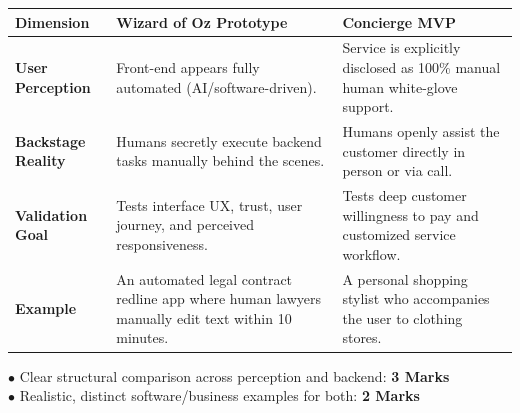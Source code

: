 \begin{solutionbox}
\begin{tabularx}{\linewidth}{|l|X|X|} \hline
\textbf{Dimension} & \textbf{Wizard of Oz Prototype} & \textbf{Concierge MVP} \\ \hline
\textbf{User Perception} & Front-end appears fully automated (AI/software-driven). & Service is explicitly disclosed as 100\% manual human white-glove support. \\ \hline
\textbf{Backstage Reality} & Humans secretly execute backend tasks manually behind the scenes. & Humans openly assist the customer directly in person or via call. \\ \hline
\textbf{Validation Goal} & Tests interface UX, trust, user journey, and perceived responsiveness. & Tests deep customer willingness to pay and customized service workflow. \\ \hline
\textbf{Example} & An automated legal contract redline app where human lawyers manually edit text within 10 minutes. & A personal shopping stylist who accompanies the user to clothing stores. \\ \hline
\end{tabularx}
\begin{markingrubric}
$\bullet$ Clear structural comparison across perception and backend: \textbf{3 Marks}\\
$\bullet$ Realistic, distinct software/business examples for both: \textbf{2 Marks}
\end{markingrubric}
\end{solutionbox}

